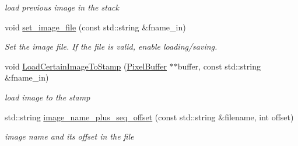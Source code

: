 \begin{DoxyCompactItemize}
\begin{DoxyCompactList}\small\item\em load previous image in the stack \end{DoxyCompactList}\item 
void \hyperlink{classimage__tools_1_1MIAIOManager_a209180ddcfe3bf43d8fd7c6635391ea4}{set\+\_\+image\+\_\+file} (const std\+::string \&fname\+\_\+in)
\begin{DoxyCompactList}\small\item\em Set the image file. If the file is valid, enable loading/saving. \end{DoxyCompactList}\item 
void \hyperlink{classimage__tools_1_1MIAIOManager_a58cea104423fd279bbab51024ee3a502}{Load\+Certain\+Image\+To\+Stamp} (\hyperlink{classimage__tools_1_1PixelBuffer}{Pixel\+Buffer} $\ast$$\ast$buffer, const std\+::string \&fname\+\_\+in)\hypertarget{classimage__tools_1_1MIAIOManager_a58cea104423fd279bbab51024ee3a502}{}\label{classimage__tools_1_1MIAIOManager_a58cea104423fd279bbab51024ee3a502}

\begin{DoxyCompactList}\small\item\em load image to the stamp \end{DoxyCompactList}\item 
std\+::string \hyperlink{classimage__tools_1_1MIAIOManager_ada4fae71b72e3a28ba40ffbc24ef8683}{image\+\_\+name\+\_\+plus\+\_\+seq\+\_\+offset} (const std\+::string \&filename, int offset)\hypertarget{classimage__tools_1_1MIAIOManager_ada4fae71b72e3a28ba40ffbc24ef8683}{}\label{classimage__tools_1_1MIAIOManager_ada4fae71b72e3a28ba40ffbc24ef8683}

\begin{DoxyCompactList}\small\item\em image name and its offset in the file \end{DoxyCompactList}\end{DoxyCompactItemize}
